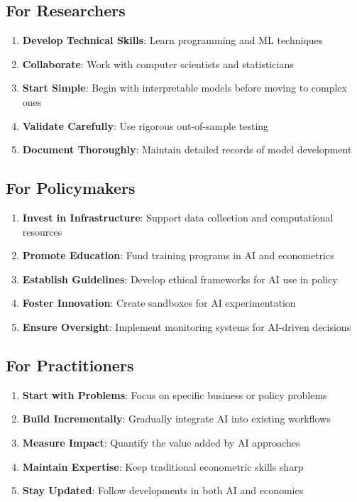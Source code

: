 \documentclass[12pt,a4paper]{article}
\begin{document}
\subsection{For Researchers}

\begin{enumerate}
    \item \textbf{Develop Technical Skills}: Learn programming and ML techniques
    \item \textbf{Collaborate}: Work with computer scientists and statisticians
    \item \textbf{Start Simple}: Begin with interpretable models before moving to complex ones
    \item \textbf{Validate Carefully}: Use rigorous out-of-sample testing
    \item \textbf{Document Thoroughly}: Maintain detailed records of model development
\end{enumerate}

\subsection{For Policymakers}

\begin{enumerate}
    \item \textbf{Invest in Infrastructure}: Support data collection and computational resources
    \item \textbf{Promote Education}: Fund training programs in AI and econometrics
    \item \textbf{Establish Guidelines}: Develop ethical frameworks for AI use in policy
    \item \textbf{Foster Innovation}: Create sandboxes for AI experimentation
    \item \textbf{Ensure Oversight}: Implement monitoring systems for AI-driven decisions
\end{enumerate}

\subsection{For Practitioners}

\begin{enumerate}
    \item \textbf{Start with Problems}: Focus on specific business or policy problems
    \item \textbf{Build Incrementally}: Gradually integrate AI into existing workflows
    \item \textbf{Measure Impact}: Quantify the value added by AI approaches
    \item \textbf{Maintain Expertise}: Keep traditional econometric skills sharp
    \item \textbf{Stay Updated}: Follow developments in both AI and economics
\end{enumerate}
\end{document}
